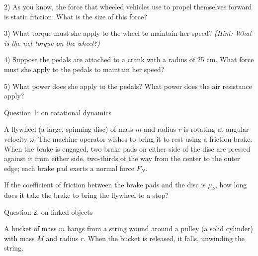\documentclass[12pt]{article}
\begin{document}
2) As you know, the force that wheeled vehicles use to propel themselves forward is static friction. What is the size of this force?
\vspace {1.2in}

3) What torque must she apply to the wheel to maintain her speed? \textit{(Hint: What is the net torque on the wheel?)}
\vspace{2in}

\newpage

4) Suppose the pedals are attached to a crank with a radius of 25 cm. What force must she apply to the pedals to maintain her speed?
\vspace{3in}

5) What power does she apply to the pedals? What power does the air resistance apply?
\newpage

\Large
\centerline{}
\normalsize
\centerline{}


\centerline{\large Question 1: on rotational dynamics}
A flywheel (a large, spinning disc) of mass $m$ and radius $r$ is rotating
at angular velocity $\omega$. The machine operator wishes to bring it to rest using a friction brake. When the brake
is engaged, two brake pads on either side of the disc are pressed against it from either side, two-thirds
of the way from the center to the outer edge; each brake pad
exerts a normal force $F_N$.

If the coefficient of friction between the brake pads and the disc is $\mu_k$, how long does it take the
brake to bring the flywheel to a stop?

\newpage
\centerline{\large Question 2: on linked objects}

A bucket of mass $m$ hangs from a string wound around a pulley
(a solid cylinder) with mass $M$ and radius $r$. When the bucket is
released, it falls, unwinding the string.
\end{document}
